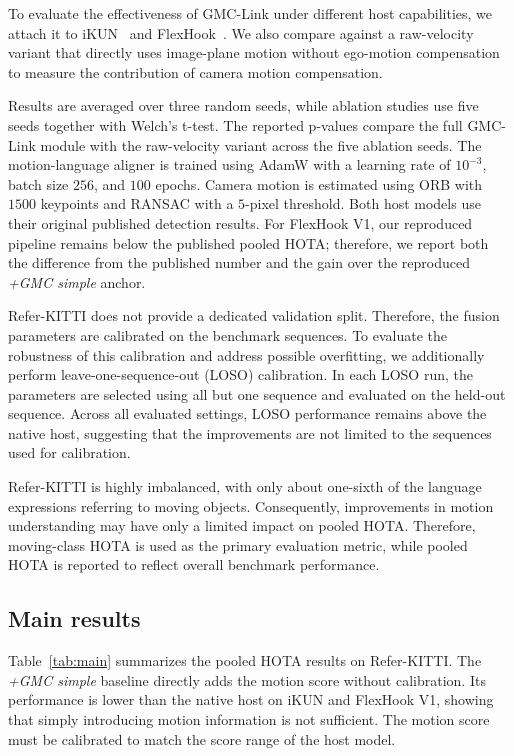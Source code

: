 \documentclass[sigconf,anonymous,nonacm]{acmart}
\begin{document}
To evaluate the effectiveness of GMC-Link under different host capabilities, we attach it to iKUN~\cite{ikun} and FlexHook~\cite{flexhook}. We also compare against a raw-velocity variant that directly uses image-plane motion without ego-motion compensation to measure the contribution of camera motion compensation.

Results are averaged over three random seeds, while ablation studies use five seeds together with Welch's t-test. The reported p-values compare the full GMC-Link module with the raw-velocity variant across the five ablation seeds. The motion-language aligner is trained using AdamW with a learning rate of $10^{-3}$, batch size $256$, and $100$ epochs. Camera motion is estimated using ORB with $1500$ keypoints and RANSAC with a $5$-pixel threshold. Both host models use their original published detection results. For FlexHook V1, our reproduced pipeline remains below the published pooled HOTA; therefore, we report both the difference from the published number and the gain over the reproduced \emph{+GMC simple} anchor.

Refer-KITTI does not provide a dedicated validation split. Therefore, the fusion parameters are calibrated on the benchmark sequences. To evaluate the robustness of this calibration and address possible overfitting, we additionally perform leave-one-sequence-out (LOSO) calibration. In each LOSO run, the parameters are selected using all but one sequence and evaluated on the held-out sequence. Across all evaluated settings, LOSO performance remains above the native host, suggesting that the improvements are not limited to the sequences used for calibration.

Refer-KITTI is highly imbalanced, with only about one-sixth of the language expressions referring to moving objects. Consequently, improvements in motion understanding may have only a limited impact on pooled HOTA. Therefore, moving-class HOTA is used as the primary evaluation metric, while pooled HOTA is reported to reflect overall benchmark performance.

\subsection{Main results}
\label{sec:main}

Table~\ref{tab:main} summarizes the pooled HOTA results on Refer-KITTI. The \emph{+GMC simple} baseline directly adds the motion score without calibration. Its performance is lower than the native host on iKUN and FlexHook V1, showing that simply introducing motion information is not sufficient. The motion score must be calibrated to match the score range of the host model.
\end{document}
